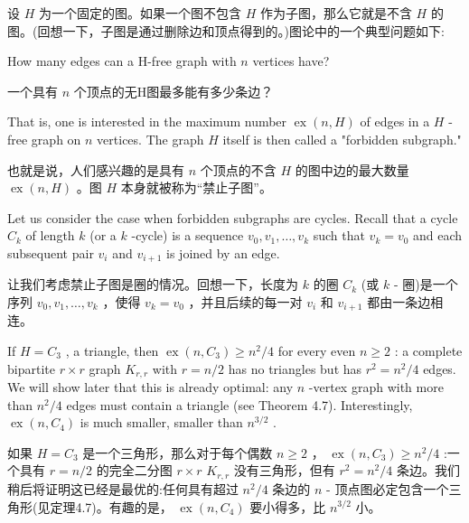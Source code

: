 \documentclass[10pt]{article}
\begin{document}
\begin{tcolorbox}\relax
设 \(H\) 为一个固定的图。如果一个图不包含 \(H\) 作为子图，那么它就是不含 \(H\) 的图。(回想一下，子图是通过删除边和顶点得到的。)图论中的一个典型问题如下:
\end{tcolorbox}

How many edges can a H-free graph with \(n\) vertices have?

\begin{tcolorbox}\relax
一个具有 \(n\) 个顶点的无H图最多能有多少条边？
\end{tcolorbox}

That is, one is interested in the maximum number \(\operatorname{ex}\left( {n,H}\right)\) of edges in a \(H\) -free graph on \(n\) vertices. The graph \(H\) itself is then called a "forbidden subgraph."

\begin{tcolorbox}\relax
也就是说，人们感兴趣的是具有 \(n\) 个顶点的不含 \(H\) 的图中边的最大数量 \(\operatorname{ex}\left( {n,H}\right)\) 。图 \(H\) 本身就被称为“禁止子图”。
\end{tcolorbox}

Let us consider the case when forbidden subgraphs are cycles. Recall that a cycle \({C}_{k}\) of length \(k\) (or a \(k\) -cycle) is a sequence \({v}_{0},{v}_{1},\ldots ,{v}_{k}\) such that \({v}_{k} = {v}_{0}\) and each subsequent pair \({v}_{i}\) and \({v}_{i + 1}\) is joined by an edge.

\begin{tcolorbox}\relax
让我们考虑禁止子图是圈的情况。回想一下，长度为 \(k\) 的圈 \({C}_{k}\) (或 \(k\) - 圈)是一个序列 \({v}_{0},{v}_{1},\ldots ,{v}_{k}\) ，使得 \({v}_{k} = {v}_{0}\) ，并且后续的每一对 \({v}_{i}\) 和 \({v}_{i + 1}\) 都由一条边相连。
\end{tcolorbox}

If \(H = {C}_{3}\) , a triangle, then \(\operatorname{ex}\left( {n,{C}_{3}}\right)  \geq  {n}^{2}/4\) for every even \(n \geq  2\) : a complete bipartite \(r \times  r\) graph \({K}_{r,r}\) with \(r = n/2\) has no triangles but has \({r}^{2} = {n}^{2}/4\) edges. We will show later that this is already optimal: any \(n\) -vertex graph with more than \({n}^{2}/4\) edges must contain a triangle (see Theorem 4.7). Interestingly, \(\operatorname{ex}\left( {n,{C}_{4}}\right)\) is much smaller, smaller than \({n}^{3/2}\) .

\begin{tcolorbox}\relax
如果 \(H = {C}_{3}\) 是一个三角形，那么对于每个偶数 \(n \geq  2\) ， \(\operatorname{ex}\left( {n,{C}_{3}}\right)  \geq  {n}^{2}/4\) :一个具有 \(r = n/2\) 的完全二分图 \(r \times  r\)  \({K}_{r,r}\) 没有三角形，但有 \({r}^{2} = {n}^{2}/4\) 条边。我们稍后将证明这已经是最优的:任何具有超过 \({n}^{2}/4\) 条边的 \(n\) - 顶点图必定包含一个三角形(见定理4.7)。有趣的是， \(\operatorname{ex}\left( {n,{C}_{4}}\right)\) 要小得多，比 \({n}^{3/2}\) 小。
\end{tcolorbox}
\end{document}
